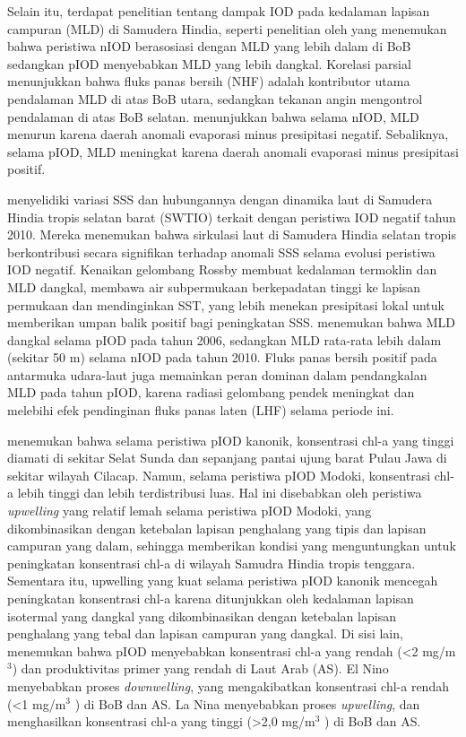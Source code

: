 \begin{spacing}{1.5}
	Selain itu, terdapat penelitian tentang dampak IOD pada kedalaman lapisan campuran (MLD) di Samudera Hindia, seperti penelitian oleh  yang menemukan bahwa peristiwa nIOD berasosiasi dengan MLD yang lebih dalam di BoB sedangkan pIOD menyebabkan MLD yang lebih dangkal. Korelasi parsial menunjukkan bahwa fluks panas bersih (NHF) adalah kontributor utama pendalaman MLD di atas BoB utara, sedangkan tekanan angin mengontrol pendalaman di atas BoB selatan.  menunjukkan bahwa selama nIOD, MLD menurun karena daerah anomali evaporasi minus presipitasi negatif. Sebaliknya, selama pIOD, MLD meningkat karena daerah anomali evaporasi minus presipitasi positif. 
	
	 menyelidiki variasi SSS dan hubungannya dengan dinamika laut di Samudera Hindia tropis selatan barat (SWTIO) terkait dengan peristiwa IOD negatif tahun 2010. Mereka menemukan bahwa sirkulasi laut di Samudera Hindia selatan tropis berkontribusi secara signifikan terhadap anomali SSS selama evolusi peristiwa IOD negatif. Kenaikan gelombang Rossby membuat kedalaman termoklin dan MLD dangkal, membawa air subpermukaan berkepadatan tinggi ke lapisan permukaan dan mendinginkan SST, yang lebih menekan presipitasi lokal untuk memberikan umpan balik positif bagi peningkatan SSS.  menemukan bahwa MLD dangkal selama pIOD pada tahun 2006, sedangkan MLD rata-rata lebih dalam (sekitar 50 m) selama nIOD pada tahun 2010. Fluks panas bersih positif pada antarmuka udara-laut juga memainkan peran dominan dalam pendangkalan MLD pada tahun pIOD, karena radiasi gelombang pendek meningkat dan melebihi efek pendinginan fluks panas laten (LHF) selama periode ini. 
	
	 menemukan bahwa selama peristiwa pIOD kanonik, konsentrasi chl-a yang tinggi diamati di sekitar Selat Sunda dan sepanjang pantai ujung barat Pulau Jawa di sekitar wilayah Cilacap. Namun, selama peristiwa pIOD Modoki, konsentrasi chl-a lebih tinggi dan lebih terdistribusi luas. Hal ini disebabkan oleh peristiwa \textit{upwelling} yang relatif lemah selama peristiwa pIOD Modoki, yang dikombinasikan dengan ketebalan lapisan penghalang yang tipis dan lapisan campuran yang dalam, sehingga memberikan kondisi yang menguntungkan untuk peningkatan konsentrasi chl-a di wilayah Samudra Hindia tropis tenggara. Sementara itu, upwelling yang kuat selama peristiwa pIOD kanonik mencegah peningkatan konsentrasi chl-a karena ditunjukkan oleh kedalaman lapisan isotermal yang dangkal yang dikombinasikan dengan ketebalan lapisan penghalang yang tebal dan lapisan campuran yang dangkal. Di sisi lain,  menemukan bahwa pIOD menyebabkan konsentrasi chl-a yang rendah (<2 mg/m$^3$) dan produktivitas primer yang rendah di Laut Arab (AS). El Nino menyebabkan proses \textit{downwelling}, yang mengakibatkan konsentrasi chl-a rendah (<1 mg/m$^3$ ) di BoB dan AS. La Nina menyebabkan proses \textit{upwelling}, dan menghasilkan konsentrasi chl-a yang tinggi (>2,0 mg/m$^3$ ) di BoB dan AS. 
	

\end{spacing}
